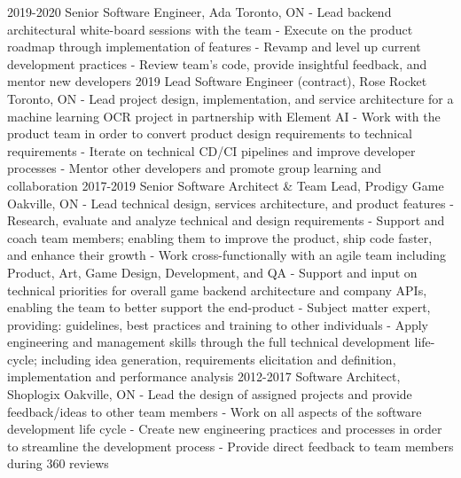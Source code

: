 \documentclass[]{cv}
\begin{document}
\begin{entrylist}
    \entry
        {2019-2020}
        {Senior Software Engineer, Ada}
        {Toronto, ON}
        {
        - Lead backend architectural white-board sessions with the team \newline
        - Execute on the product roadmap through implementation of features \newline
        - Revamp and level up current development practices \newline
        - Review team’s code, provide insightful feedback, and mentor new developers \newline
        }
    \entry
        {2019}
        {Lead Software Engineer (contract), Rose Rocket}
        {Toronto, ON}
        {
        - Lead project design, implementation, and service architecture for a machine
        learning OCR project in partnership with Element AI \newline
        - Work with the product team in order to convert product design
        requirements to technical requirements \newline
        - Iterate on technical CD/CI pipelines and improve developer processes \newline
        - Mentor other developers and promote group learning and collaboration \newline }
    \entry
        {2017-2019}
        {Senior Software Architect \& Team Lead, Prodigy Game}
        {Oakville, ON}
        {
        - Lead technical design, services architecture, and product features \newline
        - Research, evaluate and analyze technical and design requirements \newline
        - Support and coach team members; enabling them to improve the product, ship code faster, and enhance their growth \newline
        - Work cross-functionally with an agile team including Product, Art, Game Design, Development, and QA \newline
        - Support and input on technical priorities for overall game backend architecture and company APIs, enabling the team to better support the end-product \newline
        - Subject matter expert, providing: guidelines, best practices and training to other individuals \newline
        - Apply engineering and management skills through the full technical development life-cycle; including idea generation, requirements elicitation and definition,
        implementation and performance analysis \newline
        }
    \entry
        {2012-2017}
        {Software Architect, Shoplogix}
        {Oakville, ON}
        {
        - Lead the design of assigned projects and provide feedback/ideas to other team members \newline
        - Work on all aspects of the software development life cycle \newline
        - Create new engineering practices and processes in order to streamline the development process
        - Provide direct feedback to team members during 360 reviews}
\end{entrylist}
\end{document}
